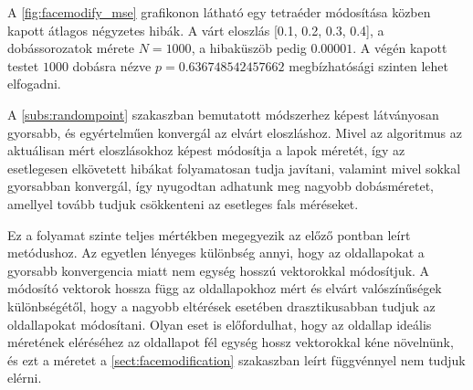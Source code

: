 A \ref{fig:facemodify_mse} grafikonon látható egy tetraéder módosítása közben kapott átlagos négyzetes hibák.
A várt eloszlás [0.1, 0.2, 0.3, 0.4], a dobássorozatok mérete $N=1000$, a hibaküszöb pedig $0.00001$.
A végén kapott testet $1000$ dobásra nézve $p=0.636748542457662$ megbízhatósági szinten lehet elfogadni.

A \ref{subs:randompoint} szakaszban bemutatott módszerhez képest látványosan gyorsabb, és egyértelműen konvergál az elvárt eloszláshoz.
Mivel az algoritmus az aktuálisan mért eloszlásokhoz képest módosítja a lapok méretét, így az esetlegesen elkövetett hibákat folyamatosan tudja javítani, valamint mivel sokkal gyorsabban konvergál, így nyugodtan adhatunk meg nagyobb dobásméretet, amellyel tovább tudjuk csökkenteni az esetleges fals méréseket.


Ez a folyamat szinte teljes mértékben megegyezik az előző pontban leírt metódushoz.
Az egyetlen lényeges különbség annyi, hogy az oldallapokat a gyorsabb konvergencia miatt nem egység hosszú vektorokkal módosítjuk.
A módosító vektorok hossza függ az oldallapokhoz mért és elvárt valószínűségek különbségétől, hogy a nagyobb eltérések esetében drasztikusabban tudjuk az oldallapokat módosítani.
Olyan eset is előfordulhat, hogy az oldallap ideális méretének eléréséhez az oldallapot fél egység hossz vektorokkal kéne növelnünk, és ezt a méretet a \ref{sect:facemodification} szakaszban leírt függvénnyel nem tudjuk elérni.
